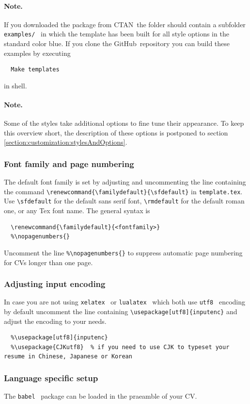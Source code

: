 \documentclass[a4paper,11pt]{article}
\newcommand{\code}[1]{\lstinline!#1!}
\newcommand{\Code}[1]{\lstinline!#1!~} %
\newcommand{\Github}{GitHub~}
\newcommand{\Ctan}{CTAN~}
\newcommand{\cvtemplate}{\code{template.tex}}
\begin{document}
\paragraph{Note.} If you downloaded the package from \Ctan the folder should contain a subfolder
\Code{examples/} in which the template has been built for all style options in the standard color blue.
If you clone the \Github repository you can build these examples by executing
\begin{lstlisting}
  Make templates
\end{lstlisting}
in shell.


\paragraph{Note.} Some of the styles take additional options to fine tune their appearance. To keep
this overview short, the description of these options is postponed to section \ref{section:customization:stylesAndOptions}.

\subsubsection*{Font family and page numbering}
The default font family is set by adjusting and uncommenting the line containing the command
\lstinline!\renewcommand{\familydefault}{\sfdefault}! in \cvtemplate.
Use \lstinline!\sfdefault! for the default sans serif font, \lstinline!\rmdefault! for the default roman one, or any Tex font name. The general syntax is
\begin{lstlisting}
  \renewcommand{\familydefault}{<fontfamily>}
  %\nopagenumbers{}
\end{lstlisting}
 Uncomment the line \lstinline!%\nopagenumbers{}! to suppress automatic page numbering for CVs longer than one page.

\subsubsection*{Adjusting input encoding}
In case you are not using \Code{xelatex} or \Code{lualatex} which both use \Code{utf8} encoding by default uncomment the line containing \lstinline!\usepackage[utf8]{inputenc}! and adjust the encoding to your needs.
\begin{lstlisting}
  %\usepackage[utf8]{inputenc}
  %\usepackage{CJKutf8}  % if you need to use CJK to typeset your resume in Chinese, Japanese or Korean
\end{lstlisting}
\subsubsection{Language specific setup}
The \Code{babel} package can be loaded in the praeamble of your CV.
\end{document}
